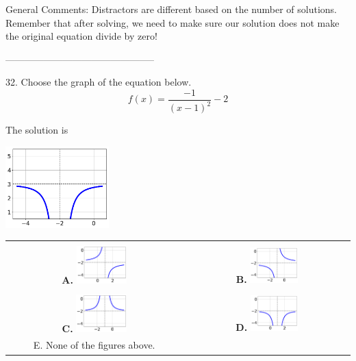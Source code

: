 \documentclass{extbook}[14pt]
\begin{document}
General Comments: Distractors are different based on the number of solutions. Remember that after solving, we need to make sure our solution does not make the original equation divide by zero!

-----------------------------------------------

32. Choose the graph of the equation below.
\[ f(x) = \frac{-1}{(x - 1)^2} - 2 \] 

 
 The solution is  
 \begin{center} \includegraphics[width=0.3\textwidth]{../Figures/rationalEquationToGraphCD.png} \end{center}\begin{tabular}{|c|c|} 
\hline 
 & \tabularnewline 
 \textbf{A.} \includegraphics[width=0.3\textwidth]{../Figures/rationalEquationToGraphAC.png} & \textbf{B.} \includegraphics[width=0.3\textwidth]{../Figures/rationalEquationToGraphBC.png} \tabularnewline 
\hline 
 & \tabularnewline 
 \textbf{C.} \includegraphics[width=0.3\textwidth]{../Figures/rationalEquationToGraphCC.png} & \textbf{D.} \includegraphics[width=0.3\textwidth]{../Figures/rationalEquationToGraphDC.png} \tabularnewline 
\hline 
 E. None of the figures above. & \tabularnewline 
\hline 
 \end{tabular} 
 
\end{document}
